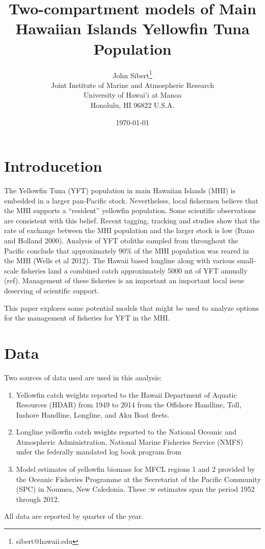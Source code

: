 \documentclass[12pt,letterpaper]{article}
\title{Two-compartment models of Main Hawaiian Islands Yellowfin Tuna
Population}
\author{
John Sibert\thanks{sibert@hawaii.edu}\\
Joint Institute of Marine and Atmospheric Research\\
University of Hawai'i at Manoa\\
Honolulu, HI  96822 U.S.A.\\[0.125in]
\date{\today}
}
\newcommand\doublespacing{\baselineskip=1.6\normalbaselineskip}
\newcommand\help[1]{\color{Magenta}{\it #1 }\normalcolor}
\begin{document}
\maketitle

\doublespacing

\section*{Introducetion}
The Yellowfin Tuna (YFT) population in main Hawaiian Islands (MHI) is
embedded in a larger pan-Pacific stock. Nevertheless, local fishermen
believe that the MHI supports a ``resident'' yellowfin population.
Some scientific observations are consistent with this belief. 
Recent tagging, tracking and
studies show that the rate of exchange between the MHI population
and the larger stock is low (Itano and Holland 2000). Analysis
of YFT otoliths sampled from
throughout the Pacific conclude that approximately 90\% of the MHI
population was reared in the MHI (Wells et al 2012).
The Hawaii based longline along with various small-scale fisheries
land a combined catch
approximately 5000 mt of YFT annually (ref). Management of these
fisheries is an important an important  local issue deserving of scientific support.

This paper explores some potential models that might be used to
analyze options for the management of fisheries for YFT in the MHI.

\section*{Data}
Two sources of data used are used in this analysis:
\begin{enumerate}
\item  Yellowfin catch weights reported to the Hawaii Department of Aquatic
Resources (HDAR) from 1949 to 2014 from the  Offshore Handline, Toll,
Inshore Handline, Longline, and Aku Boat fleets.
\item Longline yellowfin catch weights reported to the National Oceanic and
Atmospheric Administration, National Marine Fisheries Service (NMFS)
unfer the federally mandated log book program from
\help{1992 to 2014. 
\item Estimates of yellowfin catch weight of fish sampled at the
Honolulu auction by NMFS staff.
} 
\item Model estimates of yellowfin biomass for MFCL regions 1 and 2
provided by the Oceanic Fisheries Programme at the Secretariat of the
Pacific Community (SPC) in Noumea, New Caledonia. These :w
estimates span
the period 1952 through 2012.
\end{enumerate}
All data are reported by quarter of the year.
\end{document}

